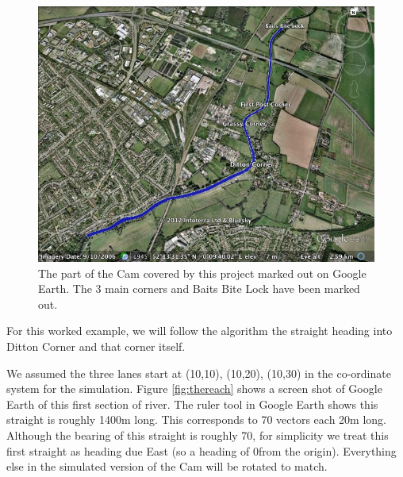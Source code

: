       \begin{figure}
      \begin{center}
        \includegraphics[scale=0.3]{images/GoogleEarthCam.png}
        \caption{The part of the Cam covered by this project marked out on Google Earth. The 3 main corners and Baits Bite Lock have been marked out.}
        \label{techissues:fig:actualcam}
      \end{center}
      \end{figure}
      
      For this worked example, we will follow the algorithm the straight heading into Ditton Corner and that corner itself.
      
      We assumed the three lanes start at (10,10), (10,20), (10,30) in the co-ordinate system for the simulation. Figure \ref{fig:thereach} shows a  screen shot of Google Earth of this first section of river. The ruler tool in Google Earth shows this straight is roughly 1400m long. This corresponds to 70 vectors each 20m long. Although the bearing of this straight is roughly 70\textdegree, for simplicity we treat this first straight as heading due East (so a heading of 0\textdegree from the origin). Everything else in the simulated version of the Cam will be rotated to match.
      
